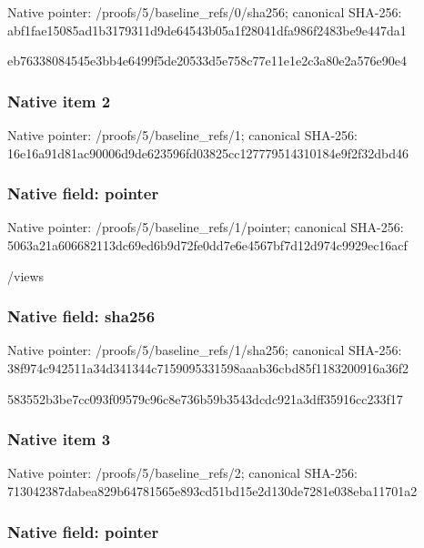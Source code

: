\documentclass[10pt,a4paper]{article}
\begin{document}
Native pointer: /proofs/5/baseline\_refs/0/sha256; canonical SHA-256: abf1fae15085ad1b3179311d\allowbreak{}9de64543b05a1f28041dfa98\allowbreak{}6f2483be9e447da1


eb76338084545e3bb4e6499f\allowbreak{}5de20533d5e758c77e11e1e2\allowbreak{}c3a80e2a576e90e4


\subsubsection{Native item 2}


Native pointer: /proofs/5/baseline\_refs/1; canonical SHA-256: 16e16a91d81ac90006d9de62\allowbreak{}3596fd03825cc12777951431\allowbreak{}0184e9f2f32dbd46



\subsubsection{Native field: pointer}


Native pointer: /proofs/5/baseline\_refs/1/pointer; canonical SHA-256: 5063a21a606682113dc69ed6\allowbreak{}b9d72fe0dd7e6e4567bf7d12\allowbreak{}d974c9929ec16acf


/views


\subsubsection{Native field: sha256}


Native pointer: /proofs/5/baseline\_refs/1/sha256; canonical SHA-256: 38f974c942511a34d341344c\allowbreak{}7159095331598aaab36cbd85\allowbreak{}f1183200916a36f2


583552b3be7cc093f09579c9\allowbreak{}6c8e736b59b3543dcdc921a3\allowbreak{}dff35916cc233f17


\subsubsection{Native item 3}


Native pointer: /proofs/5/baseline\_refs/2; canonical SHA-256: 713042387dabea829b647815\allowbreak{}65e893cd51bd15e2d130de72\allowbreak{}81e038eba11701a2



\subsubsection{Native field: pointer}
\end{document}
